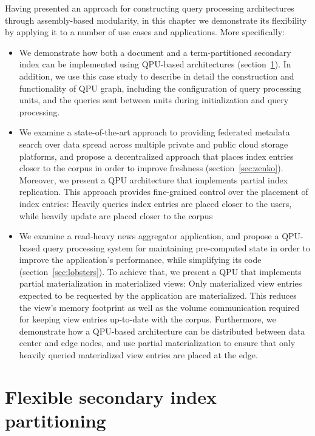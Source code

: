 Having presented an approach for constructing query processing architectures through
assembly-based modularity,
in this chapter we demonstrate its flexibility by applying it to a number of use cases and applications.
More specifically:

\begin{itemize}
  \item We demonstrate how both a document and a term-partitioned secondary
  index can be implemented using QPU-based architectures (section~\ref{sec:cs_index_partitioning}).
  In addition,
  we use this case study to describe in detail the construction and functionality of QPU graph,
  including the configuration of query processing units, and the queries sent between units
  during initialization and query processing.

  \item We examine a state-of-the-art approach to providing federated metadata search over data spread
  across multiple private and public cloud storage platforms,
  and propose a decentralized approach that places index entries closer to the corpus in order to improve
  freshness (section~\ref{sec:zenko}).
  Moreover, we present a QPU architecture that implements partial index replication.
  This approach provides fine-grained control over the placement of index entries:
  Heavily queries index entries are placed closer to the users,
  while heavily update are placed closer to the corpus

  \item We examine a read-heavy news aggregator application,
  and propose a QPU-based query processing system for maintaining pre-computed state in order to improve the application's performance,
  while simplifying its code (section~\ref{sec:lobsters}).
  To achieve that, we present a QPU that implements partial materialization in materialized views:
  Only materialized view entries expected to be requested by the application are materialized.
  This reduces the view's memory footprint as well as the volume communication required for keeping view entries up-to-date
  with the corpus.
  Furthermore, we demonstrate how a QPU-based architecture can be distributed between data center and edge nodes,
  and use partial materialization to ensure that only heavily queried materialized view entries are placed at the edge.
\end{itemize}

\section{Flexible secondary index partitioning}
\label{sec:cs_index_partitioning}

